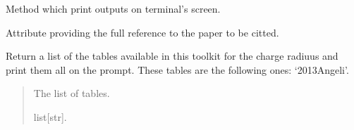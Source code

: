 \documentclass[letterpaper,10pt,english]{sphinxmanual}
\begin{document}
\begin{fulllineitems}

\begin{fulllineitems}
\label{\detokenize{source/api/setup_rad_ch:nucleardatapy.setup_rad_ch.SetupRadCh.print_outputs}}
\pysigstartsignatures
{}
\pysigstopsignatures
\sphinxAtStartPar
Method which print outputs on terminal’s screen.

\end{fulllineitems}


\begin{fulllineitems}
\label{\detokenize{source/api/setup_rad_ch:nucleardatapy.setup_rad_ch.SetupRadCh.ref}}
\pysigstartsignatures
{}
\pysigstopsignatures
\sphinxAtStartPar
Attribute providing the full reference to the paper to be citted.

\end{fulllineitems}


\end{fulllineitems}


\begin{fulllineitems}
\label{\detokenize{source/api/setup_rad_ch:nucleardatapy.setup_rad_ch.tables_rad_ch}}
\pysigstartsignatures
{}
\pysigstopsignatures
\sphinxAtStartPar
Return a list of the tables available in this toolkit for the charge radiuus and
print them all on the prompt.  These tables are the following
ones: ‘2013\sphinxhyphen{}Angeli’.
\begin{quote}\begin{description}
\sphinxAtStartPar
The list of tables.

\sphinxAtStartPar
list{[}str{]}.

\end{description}\end{quote}

\end{fulllineitems}
\end{document}
